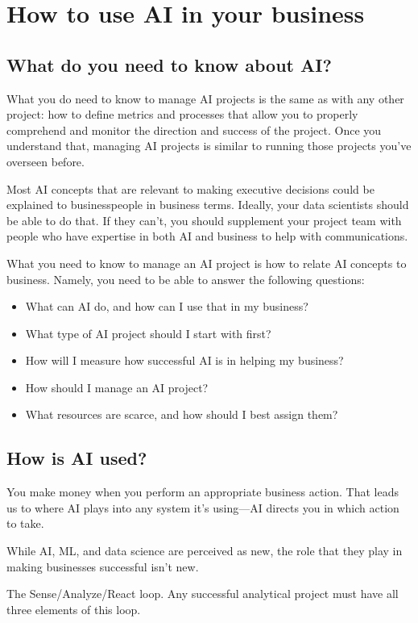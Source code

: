 \section{How to use AI in your business}



\subsection{What do you need to know about AI?}
What you do need to know to manage AI projects is the same as with
any other project: how to define metrics and processes that allow
you to properly comprehend and monitor the direction and success
of the project. Once you understand that, managing AI projects is
similar to running those projects you've overseen before.

Most AI concepts that are relevant to making executive decisions
could be explained to businesspeople in business terms. Ideally,
your data scientists should be able to do that. If they can't,
you should supplement your project team with people who have
expertise in both AI and business to help with communications.

What you need to know to manage an AI project is how to relate
AI concepts to business. Namely, you need to be able to answer
the following questions:
\begin{itemize}
    \item What can AI do, and how can I use that in my business?
    \item What type of AI project should I start with first?
    \item How will I measure how successful AI is in helping my business?
    \item How should I manage an AI project?
    \item What resources are scarce, and how should I best assign them?
\end{itemize}


\subsection{How is AI used?}
You make money when you perform an appropriate business action.
That leads us to where AI plays into any system it's using—AI
directs you in which action to take.

While AI, ML, and data science are perceived as new, the role
that they play in making businesses successful isn't new.

The Sense/Analyze/React loop. Any successful analytical project
must have all three elements of this loop.

